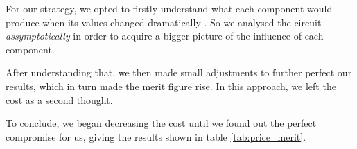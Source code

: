 For our strategy, we opted to firstly understand what each component would produce when its values changed dramatically . So we analysed the circuit \textit{assymptotically} in order to acquire a bigger picture of the influence of each component.

After understanding that, we then made small adjustments to further perfect our results, which in turn made the merit figure rise. In this approach, we left the cost as a second thought.   

To conclude, we began decreasing the cost until we found out the perfect compromise for us, giving the results shown in table \ref{tab:price_merit}.


